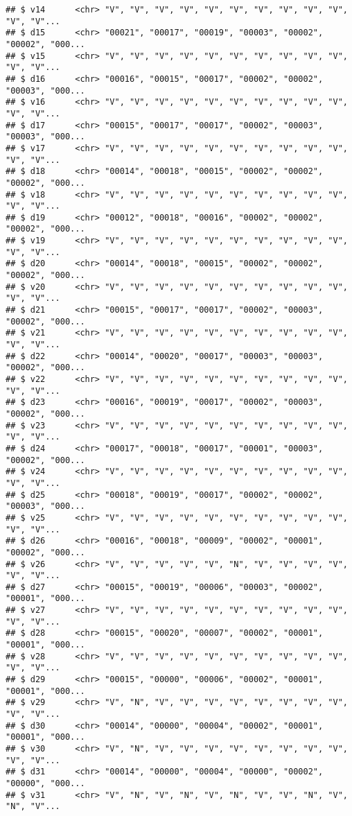 \documentclass[]{article}
\begin{document}
\begin{verbatim}
## $ v14      <chr> "V", "V", "V", "V", "V", "V", "V", "V", "V", "V", "V", "V"...
## $ d15      <chr> "00021", "00017", "00019", "00003", "00002", "00002", "000...
## $ v15      <chr> "V", "V", "V", "V", "V", "V", "V", "V", "V", "V", "V", "V"...
## $ d16      <chr> "00016", "00015", "00017", "00002", "00002", "00003", "000...
## $ v16      <chr> "V", "V", "V", "V", "V", "V", "V", "V", "V", "V", "V", "V"...
## $ d17      <chr> "00015", "00017", "00017", "00002", "00003", "00003", "000...
## $ v17      <chr> "V", "V", "V", "V", "V", "V", "V", "V", "V", "V", "V", "V"...
## $ d18      <chr> "00014", "00018", "00015", "00002", "00002", "00002", "000...
## $ v18      <chr> "V", "V", "V", "V", "V", "V", "V", "V", "V", "V", "V", "V"...
## $ d19      <chr> "00012", "00018", "00016", "00002", "00002", "00002", "000...
## $ v19      <chr> "V", "V", "V", "V", "V", "V", "V", "V", "V", "V", "V", "V"...
## $ d20      <chr> "00014", "00018", "00015", "00002", "00002", "00002", "000...
## $ v20      <chr> "V", "V", "V", "V", "V", "V", "V", "V", "V", "V", "V", "V"...
## $ d21      <chr> "00015", "00017", "00017", "00002", "00003", "00002", "000...
## $ v21      <chr> "V", "V", "V", "V", "V", "V", "V", "V", "V", "V", "V", "V"...
## $ d22      <chr> "00014", "00020", "00017", "00003", "00003", "00002", "000...
## $ v22      <chr> "V", "V", "V", "V", "V", "V", "V", "V", "V", "V", "V", "V"...
## $ d23      <chr> "00016", "00019", "00017", "00002", "00003", "00002", "000...
## $ v23      <chr> "V", "V", "V", "V", "V", "V", "V", "V", "V", "V", "V", "V"...
## $ d24      <chr> "00017", "00018", "00017", "00001", "00003", "00002", "000...
## $ v24      <chr> "V", "V", "V", "V", "V", "V", "V", "V", "V", "V", "V", "V"...
## $ d25      <chr> "00018", "00019", "00017", "00002", "00002", "00003", "000...
## $ v25      <chr> "V", "V", "V", "V", "V", "V", "V", "V", "V", "V", "V", "V"...
## $ d26      <chr> "00016", "00018", "00009", "00002", "00001", "00002", "000...
## $ v26      <chr> "V", "V", "V", "V", "V", "N", "V", "V", "V", "V", "V", "V"...
## $ d27      <chr> "00015", "00019", "00006", "00003", "00002", "00001", "000...
## $ v27      <chr> "V", "V", "V", "V", "V", "V", "V", "V", "V", "V", "V", "V"...
## $ d28      <chr> "00015", "00020", "00007", "00002", "00001", "00001", "000...
## $ v28      <chr> "V", "V", "V", "V", "V", "V", "V", "V", "V", "V", "V", "V"...
## $ d29      <chr> "00015", "00000", "00006", "00002", "00001", "00001", "000...
## $ v29      <chr> "V", "N", "V", "V", "V", "V", "V", "V", "V", "V", "V", "V"...
## $ d30      <chr> "00014", "00000", "00004", "00002", "00001", "00001", "000...
## $ v30      <chr> "V", "N", "V", "V", "V", "V", "V", "V", "V", "V", "V", "V"...
## $ d31      <chr> "00014", "00000", "00004", "00000", "00002", "00000", "000...
## $ v31      <chr> "V", "N", "V", "N", "V", "N", "V", "V", "N", "V", "N", "V"...
\end{verbatim}
\end{document}
